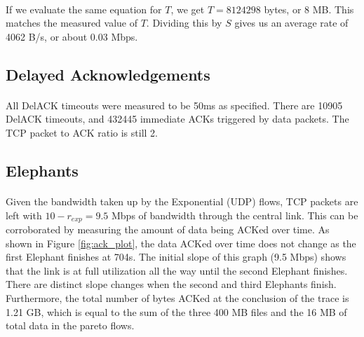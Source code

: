 \documentclass{article}
\begin{document}
      \paragraph{}
        If we evaluate the same equation for $T$, we get $T = 8124298$ bytes, or 8 MB. This matches the measured value of $T$.
        Dividing this by $S$ gives us an average rate of 4062 B/s, or about 0.03 Mbps.

    \subsection{Delayed Acknowledgements}
      \paragraph{}
        All DelACK timeouts were measured to be 50ms as specified.
        There are 10905 DelACK timeouts, and 432445 immediate ACKs triggered by data packets.
        The TCP packet to ACK ratio is still 2.

    \subsection{Elephants}
      \paragraph{}
        Given the bandwidth taken up by the Exponential (UDP) flows, TCP packets are left with $10 - r_{exp} = 9.5$ Mbps of bandwidth through the central link.
        This can be corroborated by measuring the amount of data being ACKed over time.
        As shown in Figure \ref{fig:ack_plot}, the data ACKed over time does not change as the first Elephant finishes at 704s.
        The initial slope of this graph (9.5 Mbps) shows that the link is at full utilization all the way until the second Elephant finishes.
        There are distinct slope changes when the second and third Elephants finish.
        Furthermore, the total number of bytes ACKed at the conclusion of the trace is 1.21 GB, which is equal to the sum of the three 400 MB files and the 16 MB of total data in the pareto flows.
\end{document}
